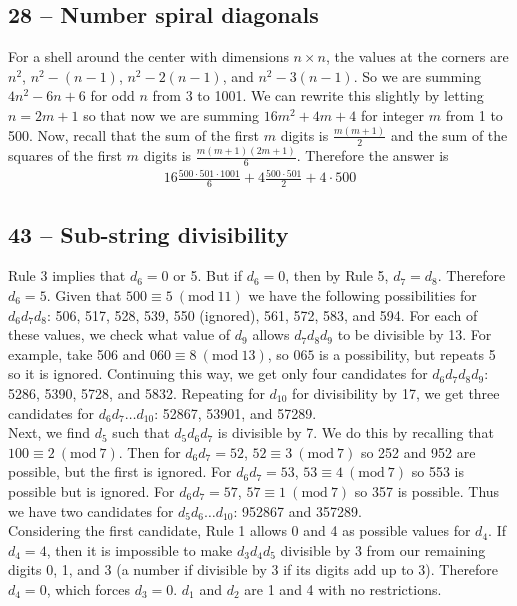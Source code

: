 \documentclass{article}
\newcommand{\Mod}[1]{\ (\mathrm{mod}\ #1)}
\begin{document}
\subsection*{28 -- Number spiral diagonals}
For a shell around the center with dimensions $n \times n$, the values at the corners are $n^2$, $n^2 - (n-1)$, $n^2 - 2(n-1)$, and $n^2 - 3(n-1)$.
So we are summing $4n^2 - 6n + 6$ for odd $n$ from 3 to 1001.
We can rewrite this slightly by letting $n = 2m+1$ so that now we are summing $16m^2 + 4m + 4$ for integer $m$ from 1 to 500.
Now, recall that the sum of the first $m$ digits is $\frac{m(m+1)}{2}$ and the sum of the squares of the first $m$ digits is $\frac{m(m+1)(2m+1)}{6}$.
Therefore the answer is
\begin{align*}
	\boxed{ 16 \frac{500 \cdot 501 \cdot 1001}{6} + 4 \frac{500 \cdot 501}{2} + 4 \cdot 500 }
\end{align*}


\subsection*{43 -- Sub-string divisibility}
Rule 3 implies that $d_6 = 0$ or 5.
But if $d_6=0$, then by Rule 5, $d_7=d_8$.
Therefore $d_6 = 5$.
Given that $500 \equiv 5 \Mod{11}$ we have the following possibilities for $d_6d_7d_8$: 506, 517, 528, 539, 550 (ignored), 561, 572, 583, and 594.
For each of these values, we check what value of $d_9$ allows $d_7d_8d_9$ to be divisible by 13.
For example, take 506 and $060 \equiv 8 \Mod{13}$, so $065$ is a possibility, but repeats 5 so it is ignored.
Continuing this way, we get only four candidates for $d_6d_7d_8d_9$: 5286, 5390, 5728, and 5832.
Repeating for $d_{10}$ for divisibility by 17, we get three candidates for $d_6d_7\dotsc d_{10}$: 52867, 53901, and 57289. \\

Next, we find $d_5$ such that $d_5d_6d_7$ is divisible by 7.
We do this by recalling that $100 \equiv 2 \Mod{7}$.
Then for $d_6d_7 = 52$, $52 \equiv 3 \Mod{7}$ so 252 and 952 are possible, but the first is ignored.
For $d_6d_7 = 53$, $53 \equiv 4 \Mod{7}$ so 553 is possible but is ignored.
For $d_6d_7=57$, $57 \equiv 1 \Mod{7}$ so 357 is possible.
Thus we have two candidates for $d_5d_6\dotsc d_{10}$: 952867 and 357289. \\

Considering the first candidate, Rule 1 allows 0 and 4 as possible values for $d_4$.
If $d_4 = 4$, then it is impossible to make $d_3d_4d_5$ divisible by 3 from our remaining digits 0, 1, and 3 (a number if divisible by 3 if its digits add up to 3).
Therefore $d_4 = 0$, which forces $d_3=0$.
$d_1$ and $d_2$ are 1 and 4 with no restrictions. \\
\end{document}
